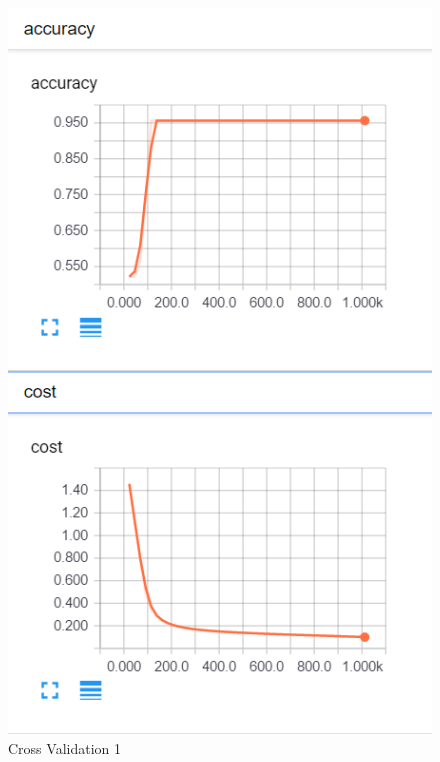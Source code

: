 \documentclass[12pt]{article}
\begin{document}
\begin{figure}[H]
	\begin{center}
	\includegraphics{./pictures/cv1.png}
	\caption{Cross Validation 1}
	\label{GD}
	\end{center}
\end{figure}
\end{document}

